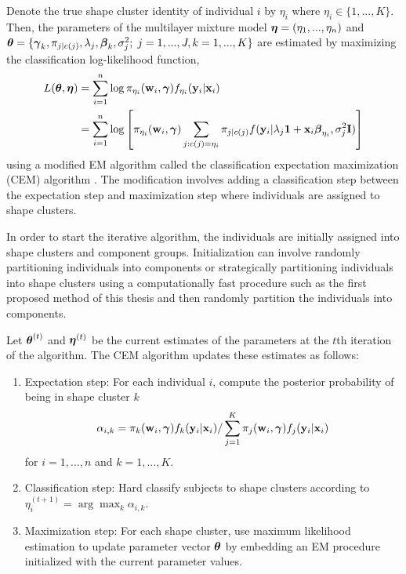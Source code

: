 Denote the true shape cluster identity of individual $i$ by $\eta_{i}$ where $\eta_{i}\in\{1,...,K\}$. Then, the parameters of the multilayer mixture model $\boldsymbol\eta=(\eta_{1},...,\eta_{n})$ and $\boldsymbol\theta=\{\boldsymbol \gamma_{k}, \pi_{j|c(j)},\lambda_{j}, \boldsymbol\beta_{k},\sigma^{2}_{j};\; j=1,...,J, k=1,...,K\}$  are estimated by maximizing the classification log-likelihood function,
\begin{align}
 L(\boldsymbol\theta,\boldsymbol\eta) &= \sum^{n}_{i=1} \log \pi_{\eta_{i}}(\mathbf w_{i},\boldsymbol\gamma) f_{\eta_{i}}(\mathbf y_{i}|\mathbf x_{i})\nonumber\\
\label{ll}& =  \sum^{n}_{i=1} \log\left[ \pi_{\eta_{i}}(\mathbf w_{i},\boldsymbol\gamma)  \sum_{j: c(j) = \eta_{i}} \pi_{j|c(j)}f(\mathbf y_{i}|\lambda_{j}\mathbf 1 + \mathbf x_{i}\boldsymbol\beta_{\eta_{i}},\sigma^{2}_{j}\mathbf I)\right]
\end{align} 
using a modified EM algorithm called the classification expectation maximization (CEM) algorithm \cite{celeux1992, mclachlan2000}. The modification involves adding a classification step between the expectation step and maximization step where individuals are assigned to shape clusters. 

In order to start the iterative algorithm, the individuals are initially assigned into shape clusters and component groups. Initialization can involve randomly partitioning individuals into components or strategically partitioning individuals into shape clusters using a computationally fast procedure such as the first proposed method of this thesis and then randomly partition the individuals into components. 

Let $\boldsymbol\theta^{(t)}$ and $\boldsymbol\eta^{(t)}$ be the current estimates of the parameters at the $t$th iteration of the algorithm. The CEM algorithm updates these estimates as follows:
\begin{enumerate}
\item Expectation step: For each individual $i$, compute the posterior probability of being in shape cluster $k$
$$\alpha_{i,k}= \pi_{k}(\mathbf w_{i},\boldsymbol\gamma)f_{k}(\mathbf y_{i}|\mathbf x_{i})/\sum^{K}_{j=1} \pi_{j}(\mathbf w_{i},\boldsymbol\gamma)f_{j}(\mathbf y_{i}|\mathbf x_{i})$$
for $i=1,...,n$ and $k=1,...,K$.
\item Classification step: Hard classify subjects to shape clusters according to $\eta^{(t+1)}_{i} = \arg\max_{k} \alpha_{i,k}$.
\item Maximization step: For each shape cluster, use maximum likelihood estimation to update parameter vector $\boldsymbol\theta$ by embedding an EM procedure initialized with the current parameter values.
\end{enumerate} 

